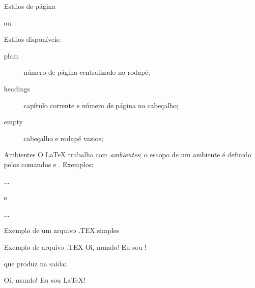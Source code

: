 \begin{frame}{Estilos de página}
	\begin{Codigo}{}
		\n
		ou\n
	\end{Codigo}

	\pause
	Estilos disponíveis:

	\begin{description}
		\item [plain] número de página centralizado no rodapé;
		\pause
		\item [headings] capítulo corrente e número de página no cabeçalho;
		\pause
		\item [empty] cabeçalho e rodapé vazios;
	\end{description}
\end{frame}

\begin{frame}{Ambientes}
	O \LaTeX{} trabalha com \emph{ambientes}; o escopo de um ambiente é definido pelos comandos  e . \pause Exemplos:

	\begin{Codigo}{}
		...
	\end{Codigo}

	\pause e

	\begin{Codigo}{}
		...
	\end{Codigo}
\end{frame}

\begin{frame}{Exemplo de um arquivo .TEX simples}
	\begin{Codigo}{Exemplo de arquivo .TEX}
		\n
		\n
			Oi, mundo!\n
			Eu sou !\n
	\end{Codigo}

\pause
que produz na saída:

	\begin{Resultado}{}
		Oi, mundo!\n
		Eu sou \LaTeX!
	\end{Resultado}
\end{frame}

